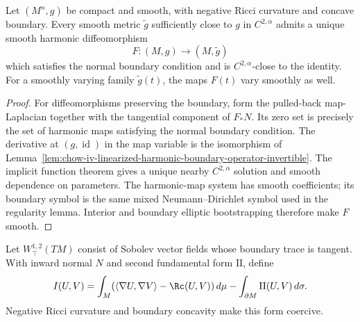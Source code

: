 \begin{proposition}
\label{prop:chow-iv-harmonic-diffeomorphism-negative-ricci}
Let \((M^n,g)\) be compact and smooth, with negative Ricci curvature and
concave boundary.  Every smooth metric \(\widetilde g\) sufficiently close to
\(g\) in \(C^{2,\alpha}\) admits a unique smooth harmonic diffeomorphism
\[
 F:(M,g)\longrightarrow(M,\widetilde g)
\]
which satisfies the normal boundary condition and is \(C^{2,\alpha}\)-close to
the identity.  For a smoothly varying family \(\widetilde g(t)\), the maps
\(F(t)\) vary smoothly as well.
\end{proposition}
\begin{proof}
\sketch
For diffeomorphisms preserving the boundary, form the pulled-back
map-Laplacian together with the tangential component of \(F_*N\).  Its zero set
is precisely the set of harmonic maps satisfying the normal boundary
condition.  The derivative at \((g,\operatorname{id})\) in the map variable is
the isomorphism of Lemma~\ref{lem:chow-iv-linearized-harmonic-boundary-operator-invertible}.
The implicit function theorem gives a unique nearby \(C^{2,\alpha}\) solution
and smooth dependence on parameters.  The harmonic-map system has smooth
coefficients; its boundary symbol is the same mixed Neumann--Dirichlet symbol
used in the regularity lemma.  Interior and boundary elliptic bootstrapping
therefore make \(F\) smooth.
\end{proof}

Let \(W^{1,2}_{\top}(TM)\) consist of Sobolev vector fields whose boundary
trace is tangent.  With inward normal \(N\) and second fundamental form
\(\mathrm{II}\), define
\[
 I(U,V)=\int_M(\langle\nabla U,\nabla V\rangle-\Rc(U,V))\,d\mu
 -\int_{\partial M}\mathrm{II}(U,V)\,d\sigma.
\]
Negative Ricci curvature and boundary concavity make this form coercive.


